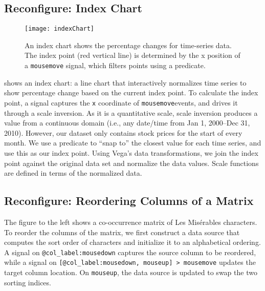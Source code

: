 \subsection{Reconfigure: Index Chart}

\vspace{-7pt}

\begin{figure}[b!]
  \centering
  \texttt{[image: indexChart]}
  \caption{An index chart shows the percentage changes for time-series data. The
  index point (red vertical line) is determined by the x position of a
  \texttt{mousemove} signal, which filters points using a predicate.}
  \label{fig:vg:indexChart}
\end{figure}

 shows an index chart: a line chart that interactively
normalizes time series to show percentage change based on the current index
point. To calculate the index point, a signal captures the \texttt{x} coordinate
of \texttt{mousemove}events, and drives it through a scale inversion. As it is a
quantitative scale, scale inversion produces a value from a continuous domain
(i.e., any date/time from Jan 1, 2000--Dec 31, 2010). However, our dataset only
contains stock prices for the start of every month. We use a predicate to ``snap
to'' the closest value for each time series, and use this as our index point.
Using Vega's data transformations, we join the index point against the original
data set and normalize the data values. Scale functions are defined in terms of
the normalized data.

\vspace{-10pt}

\subsection{Reconfigure: Reordering Columns of a Matrix}

\vspace{-7pt}


\vspace{-7pt}

The figure to the left shows a co-occurrence matrix of Les Mis\'{e}rables
characters. To reorder the columns of the matrix, we first construct a data
source that computes the sort order of characters and initialize it to an
alphabetical ordering. A signal on \texttt{@col\_label:mousedown} captures the
source column to be reordered, while a signal on \texttt{[@col\_label:mousedown,
mouseup] > mousemove} updates the target column location. On \texttt{mouseup},
the data source is updated to swap the two sorting indices.

